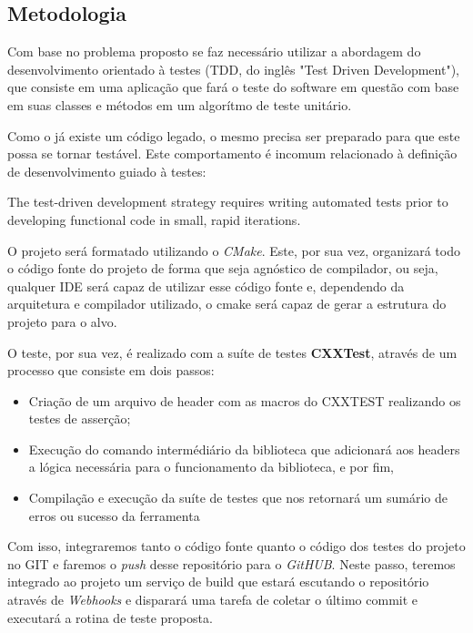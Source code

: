 \documentclass[
	article,			%
	12pt,				%
	oneside,			%
	a4paper,			%
	english,			
	brazil,
	sumario=tradicional
	]{abntex2}
\begin{document}
\subsection{Metodologia}
Com base no problema proposto se faz necessário utilizar a abordagem do desenvolvimento orientado à testes (TDD, do inglês "Test Driven Development"), que consiste em uma aplicação que fará o teste do software em questão com base em suas classes e métodos em um algorítmo de teste unitário.

Como o já existe um código legado, o mesmo precisa ser preparado para que este possa se tornar testável. Este comportamento é incomum relacionado à definição de desenvolvimento guiado à testes:

\begin{citacao}
The test-driven development strategy 
requires writing automated tests prior to 
developing functional code in small, rapid 
iterations.
	\cite[Introduction]{testdrivendevelopment.1}
\end{citacao}

O projeto será formatado utilizando o \textit{CMake}. Este, por sua vez, organizará todo o código fonte do projeto de forma que seja agnóstico de compilador, ou seja, qualquer IDE será capaz de utilizar esse código fonte e, dependendo da arquitetura e compilador utilizado, o cmake será capaz de gerar a estrutura do projeto para o alvo. 

O teste, por sua vez, é realizado com a suíte de testes \textbf{CXXTest}, através de um processo que consiste em dois passos:

\begin{itemize}
	\item{Criação de um arquivo de header com as macros do CXXTEST realizando os testes de asserção;}
	\item{Execução do comando intermédiário da biblioteca que adicionará aos headers a lógica necessária para o funcionamento da biblioteca, e por fim,}
	\item{Compilação e execução da suíte de testes que nos retornará um sumário de erros ou sucesso da ferramenta}
\end{itemize}

Com isso, integraremos tanto o código fonte quanto o código dos testes do projeto no GIT e faremos o \textit{push} desse repositório para o \textit{GitHUB}. Neste passo, teremos integrado ao projeto um serviço de build que estará escutando o repositório através de \textit{Webhooks} e disparará uma tarefa de coletar o último commit e executará a rotina de teste proposta.
\end{document}
